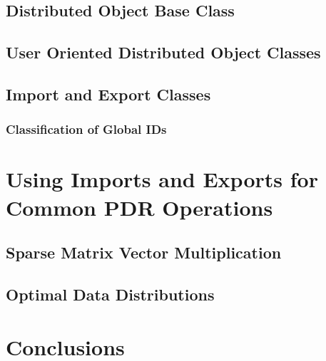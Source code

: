 \documentclass[12pt,relax]{PetraObjectModel}
\begin{document}
\subsection{Distributed Object Base Class}

\subsection{User Oriented Distributed Object Classes}

\subsection{Import and Export Classes}

\subsubsection{Classification of Global IDs}


\section{Using Imports and Exports for Common PDR Operations}

\subsection{Sparse Matrix Vector Multiplication}

\subsection{Optimal Data Distributions}

\section{Conclusions}


%
\clearpage


\end{document}
